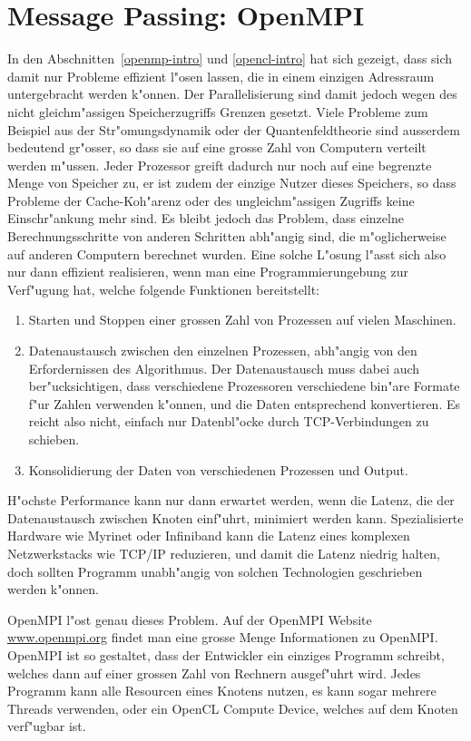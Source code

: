 \section{Message Passing: OpenMPI}
In den Abschnitten~\ref{openmp-intro} und \ref{opencl-intro}
hat sich gezeigt, dass sich damit nur Probleme effizient l"osen lassen,
die in einem einzigen Adressraum untergebracht werden k"onnen.
Der Parallelisierung sind damit jedoch wegen des nicht gleichm"assigen
Speicherzugriffs Grenzen gesetzt.
Viele Probleme zum Beispiel aus der Str"omungsdynamik oder
der Quantenfeldtheorie sind ausserdem bedeutend gr"osser, so dass sie
auf eine grosse Zahl von Computern verteilt werden m"ussen.
Jeder Prozessor greift dadurch nur noch auf eine begrenzte Menge von Speicher
zu, er ist zudem der einzige Nutzer dieses Speichers, so dass Probleme
der Cache-Koh"arenz oder des ungleichm"assigen Zugriffs keine
Einschr"ankung mehr sind.
Es bleibt jedoch das Problem, dass einzelne Berechnungsschritte
von anderen Schritten abh"angig sind, die m"oglicherweise auf anderen
Computern berechnet wurden.
Eine solche L"osung l"asst sich also nur dann effizient realisieren,
wenn man eine Programmierungebung zur Verf"ugung hat, welche folgende
Funktionen bereitstellt:
\begin{enumerate}
\item Starten und Stoppen einer grossen Zahl von Prozessen auf vielen
Maschinen.
\item Datenaustausch zwischen den einzelnen Prozessen, abh"angig von den
Erfordernissen des Algorithmus.
Der Datenaustausch muss dabei auch ber"ucksichtigen, dass verschiedene
Prozessoren verschiedene bin"are Formate f"ur Zahlen verwenden
k"onnen, und die Daten entsprechend konvertieren. Es reicht also nicht,
einfach nur Datenbl"ocke durch TCP-Verbindungen zu schieben.
\item Konsolidierung der Daten von verschiedenen Prozessen und Output.
\end{enumerate}

H"ochste Performance kann nur dann erwartet werden, wenn die Latenz, 
die der Datenaustausch zwischen Knoten einf"uhrt, minimiert werden kann.
Spezialisierte Hardware wie Myrinet oder Infiniband kann die Latenz
eines komplexen Netzwerkstacks wie TCP/IP reduzieren, und damit
die Latenz niedrig halten, doch sollten Programm unabh"angig von solchen
Technologien geschrieben werden k"onnen.

OpenMPI l"ost genau dieses Problem.
Auf der OpenMPI Website \url{www.openmpi.org} findet man
eine grosse Menge Informationen zu OpenMPI. 
OpenMPI ist so gestaltet, dass der Entwickler ein einziges Programm
schreibt, welches dann auf einer grossen Zahl von Rechnern
ausgef"uhrt wird. Jedes Programm kann alle Resourcen eines Knotens nutzen,
es kann sogar mehrere Threads verwenden, oder ein OpenCL Compute
Device, welches auf dem Knoten verf"ugbar ist.

